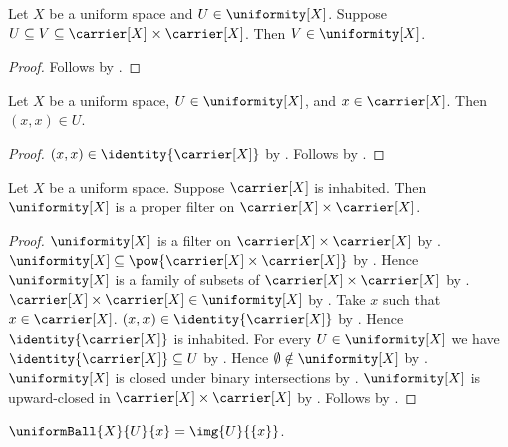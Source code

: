 \begin{proposition}\label{uniform_entourage_upward}
    Let $X$ be a uniform space and $U\in\uniformity[X]$.
    Suppose $U\subseteq V\subseteq\carrier[X]\times\carrier[X]$.
    Then $V\in\uniformity[X]$.
\end{proposition}
\begin{proof}
    Follows by .
\end{proof}

\begin{proposition}\label{uniform_entourage_reflexive}
    Let $X$ be a uniform space, $U\in\uniformity[X]$, and
        $x\in\carrier[X]$.
    Then $(x,x)\in U$.
\end{proposition}
\begin{proof}
    $(x,x)\in\identity{\carrier[X]}$ by .
    Follows by .
\end{proof}

\begin{theorem}\label{inhabited_uniformity_is_proper_filter}
    Let $X$ be a uniform space.
    Suppose $\carrier[X]$ is inhabited.
    Then $\uniformity[X]$ is a proper filter on
        $\carrier[X]\times\carrier[X]$.
\end{theorem}
\begin{proof}
    $\uniformity[X]$ is a filter on
        $\carrier[X]\times\carrier[X]$ by .
    $\uniformity[X]\subseteq
        \pow{\carrier[X]\times\carrier[X]}$
        by .
    Hence $\uniformity[X]$ is a family of subsets of
        $\carrier[X]\times\carrier[X]$
        by .
    $\carrier[X]\times\carrier[X]\in\uniformity[X]$
        by .
    Take $x$ such that $x\in\carrier[X]$.
    $(x,x)\in\identity{\carrier[X]}$ by .
    Hence $\identity{\carrier[X]}$ is inhabited.
    For every $U\in\uniformity[X]$ we have
        $\identity{\carrier[X]}\subseteq U$
        by .
    Hence $\emptyset\notin\uniformity[X]$
        by .
    $\uniformity[X]$ is closed under binary intersections
        by .
    $\uniformity[X]$ is upward-closed in
        $\carrier[X]\times\carrier[X]$
        by .
    Follows by .
\end{proof}

\begin{definition}\label{uniform_ball}
    $\uniformBall{X}{U}{x}=\img{U}{\{x\}}$.
\end{definition}

